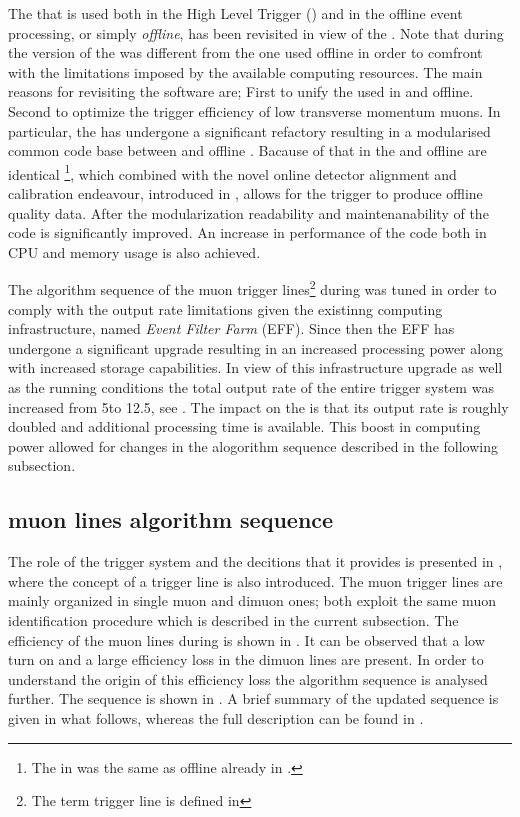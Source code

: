 
The \muonID \cite{LHCb-PUB-2009-013,LHCb-PUB-2010-002} that is used both in the High Level Trigger (\hlt) \cite{LHCb-PUB-2011-017}
and in the offline event processing, or simply {\it offline}, has been revisited in view of the \lhc \runtwo.
Note that during \runone the \hlt version of the \muonID was different from the one used offline in order
to comfront with the limitations imposed by the available computing resources. The main reasons for revisiting
the software are; First to unify the \muonID used in \hlt and offline.
Second to optimize the trigger efficiency of low transverse momentum muons.
In particular, the \muonID has undergone a significant refactory resulting in a modularised common code base
between \hlt and offline \cite{kevinThesis}. Bacause of that \muonID in the \hltone and offline
are identical \footnote{The \muonID in \hlttwo was the same as offline already in \runone.},
which combined with the novel online detector alignment and calibration endeavour, introduced in ,
allows for the trigger to produce offline quality data. After the modularization readability and maintenanability
of the code is significantly improved. An increase in performance of the \muonID code both in CPU and memory usage
is also achieved.

The algorithm sequence of the \hltone muon trigger lines\footnote{The term trigger line is defined in }
during \runone was tuned in order to comply with the output rate limitations given the existinng computing infrastructure,
named {\it Event Filter Farm} (EFF). Since then the EFF has undergone a significant upgrade resulting in an
increased processing power along with increased storage capabilities. In view of this infrastructure upgrade
as well as the \runtwo \lhc running conditions the total output rate of the entire trigger system was increased
from 5\khz to 12.5\khz, see . The impact on the \hltone is that its output rate is
roughly doubled and additional processing time is available. This boost in computing power allowed for changes
in the \muonID alogorithm sequence described in the following subsection.

\subsection{\hltone muon lines algorithm sequence}
\label{hlt1run2}

The role of the trigger system and the decitions that it provides is presented in ,
where the concept of a trigger line is also introduced. The \hltone muon trigger lines are
mainly organized in single muon and dimuon ones; both exploit the same muon identification procedure which
is described in the current subsection. The efficiency of the muon lines during \runone is shown in .
It can be observed that a low \pt turn on and a large efficiency loss in the dimuon lines are present.
In order to understand the origin of this efficiency loss the \hltone algorithm sequence \cite{LHCb-PUB-2011-017}
is analysed further. The sequence is shown  in . A brief summary of the
updated sequence is given in what follows, whereas the full description can be found in \cite{kevinThesis}.

